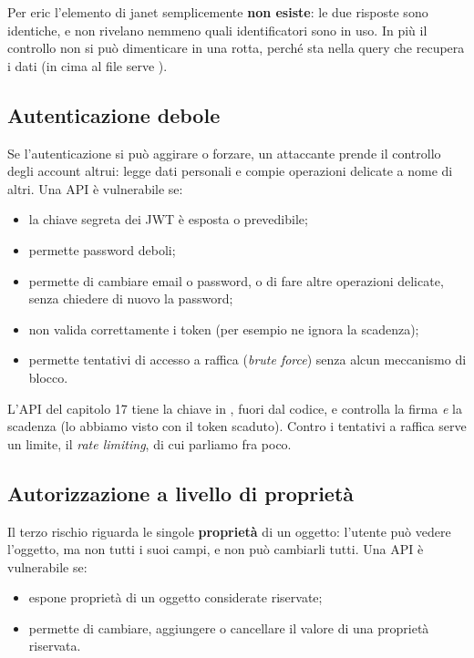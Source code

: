 Per eric l'elemento di janet semplicemente \textbf{non esiste}: le due risposte
sono identiche, e non rivelano nemmeno quali identificatori sono in uso. In più
il controllo non si può dimenticare in una rotta, perché sta nella query che
recupera i dati (in cima al file serve ).

\subsection{Autenticazione debole}

Se l'autenticazione si può aggirare o forzare, un attaccante prende il
controllo degli account altrui: legge dati personali e compie operazioni
delicate a nome di altri. Una API è vulnerabile se:

\begin{itemize}
  \item la chiave segreta dei JWT è esposta o prevedibile;
  \item permette password deboli;
  \item permette di cambiare email o password, o di fare altre operazioni
        delicate, senza chiedere di nuovo la password;
  \item non valida correttamente i token (per esempio ne ignora la scadenza);
  \item permette tentativi di accesso a raffica (\textit{brute force}) senza
        alcun meccanismo di blocco.
\end{itemize}

L'API del capitolo 17 tiene la chiave in , fuori dal codice, e
 controlla la firma \emph{e} la scadenza (lo abbiamo visto con
il token scaduto). Contro i tentativi a raffica serve un limite, il
\textit{rate limiting}, di cui parliamo fra poco.

\subsection{Autorizzazione a livello di proprietà}

Il terzo rischio riguarda le singole \textbf{proprietà} di un oggetto: l'utente
può vedere l'oggetto, ma non tutti i suoi campi, e non può cambiarli tutti. Una
API è vulnerabile se:

\begin{itemize}
  \item espone proprietà di un oggetto considerate riservate;
  \item permette di cambiare, aggiungere o cancellare il valore di una proprietà
        riservata.
\end{itemize}

